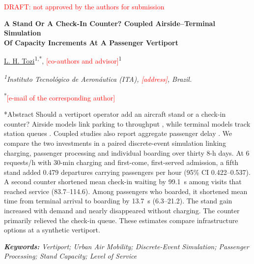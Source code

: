 \documentclass[12pt,a4paper]{article}
\makeatletter
\newcommand{\pendente}[1]{\textcolor{red}{[#1]}}
\renewcommand\section{\@startsection{section}{1}{\z@}{12pt}{4pt}{\fontsize{14}{20}\selectfont\bfseries}}
\makeatother
\begin{document}
\begin{center}
\textcolor{red}{\small DRAFT: not approved by the authors for submission}\par\medskip
{\fontsize{14}{20}\selectfont\bfseries
A Stand Or A Check-In Counter? Coupled Airside--Terminal Simulation\\
Of Capacity Increments At A Passenger Vertiport\par}
\medskip
{\fontsize{12}{18}\selectfont
\uline{L. H. Tozi}\textsuperscript{1,*}, \pendente{co-authors and advisor}\textsuperscript{1}\par}
{\fontsize{11}{16}\selectfont\itshape
\textsuperscript{1}Instituto Tecnológico de Aeronáutica (ITA), \pendente{address}, Brazil.\par
\textsuperscript{*}\pendente{e-mail of the corresponding author}\par}
\end{center}

\section*{Abstract}
Should a vertiport operator add an aircraft stand or a check-in counter? Airside models link parking to throughput \cite{guerreiro2020}, while terminal models track station queues \cite{feldhoff2022}. Coupled studies also report aggregate passenger delay \cite{preisHornung2022}. We compare the two investments in a paired discrete-event simulation linking charging, passenger processing and individual boarding over thirty 8-h days. At 6 requests/h with 30-min charging and first-come, first-served admission, a fifth stand added 0.479 departures carrying passengers per hour (95\% CI 0.422--0.537). A second counter shortened mean check-in waiting by 99.1~s among visits that reached service (83.7--114.6). Among passengers who boarded, it shortened mean time from terminal arrival to boarding by 13.7~s (6.3--21.2). The stand gain increased with demand and nearly disappeared without charging. The counter primarily relieved the check-in queue. These estimates compare infrastructure options at a synthetic vertiport.

{\itshape\textbf{Keywords:} Vertiport; Urban Air Mobility; Discrete-Event Simulation; Passenger
Processing; Stand Capacity; Level of Service\par}

\section{Introduction}
\end{document}
